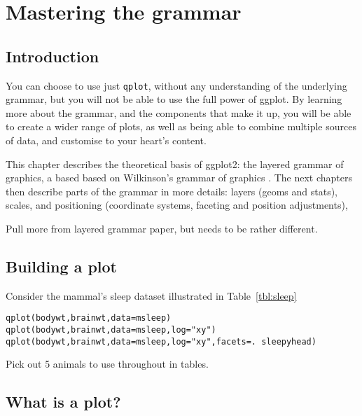 

\chapter{Mastering the grammar}
\label{cha:mastery}


\section{Introduction}\label{sec:introduction}

You can choose to use just {\tt qplot}, without any understanding of the underlying grammar, but you will not be able to use the full power of ggplot.  By learning more about the grammar, and the components that make it up, you will be able to create a wider range of plots, as well as being able to combine multiple sources of data, and customise to your heart's content.

This chapter describes the theoretical basis of ggplot2: the layered grammar of graphics, a based based on Wilkinson's grammar of graphics \citep{wilkinson:2006}.  The next chapters then describe parts of the grammar in more details: layers (geoms and stats), scales, and positioning (coordinate systems, faceting and position adjustments),

Pull more from layered grammar paper, but needs to be rather different.

\section{Building a plot}
\label{sec:building_a_plot}

Consider the mammal's sleep dataset illustrated in Table~\ref{tbl:sleep}

\begin{alltt}
  qplot(bodywt, brainwt, data=msleep)
  qplot(bodywt, brainwt, data=msleep, log="xy")
  qplot(bodywt, brainwt, data=msleep, log="xy", facets = . ~ sleepyhead)
\end{alltt}

Pick out 5 animals to use throughout in tables.

\section{What is a plot?}
\label{sec:what_is_a_plot}

